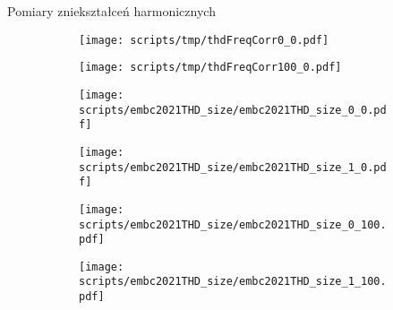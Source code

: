 \begin{frame}{Pomiary zniekształceń harmonicznych}
    \begin{figure}[H]
        \centering
            \begin{subfigure}[b]{0.485\textwidth}
                \centering
                \texttt{[image: scripts/tmp/thdFreqCorr0\_0.pdf]}
            \end{subfigure}
            \begin{subfigure}[b]{0.485\textwidth}
                \centering
                \texttt{[image: scripts/tmp/thdFreqCorr100\_0.pdf]}
            \end{subfigure}     
        \end{figure}
\end{frame}

\begin{frame}{}
    \begin{figure}[H]
        \centering
        \begin{subfigure}{0.485\textwidth}
            \centering
            \texttt{[image: scripts/embc2021THD\_size/embc2021THD\_size\_0\_0.pdf]}
        \end{subfigure}
        \begin{subfigure}{0.485\textwidth}
            \centering
            \texttt{[image: scripts/embc2021THD\_size/embc2021THD\_size\_1\_0.pdf]}
        \end{subfigure} 
        \begin{subfigure}{0.485\textwidth}
            \centering
            \texttt{[image: scripts/embc2021THD\_size/embc2021THD\_size\_0\_100.pdf]}
        \end{subfigure}
        \begin{subfigure}{0.485\textwidth}
            \centering
            \texttt{[image: scripts/embc2021THD\_size/embc2021THD\_size\_1\_100.pdf]}
        \end{subfigure}   
    \end{figure}
\end{frame}

